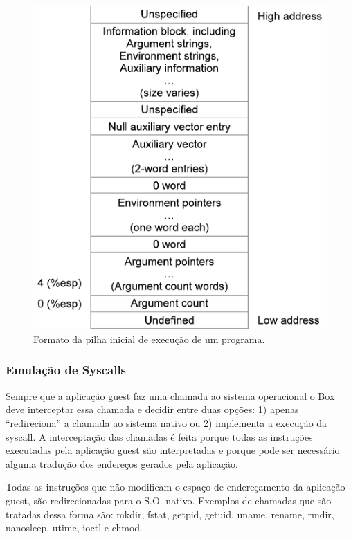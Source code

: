 \documentclass[11pt,twoside]{article}
\begin{document}
\begin{figure}[!h]
  	\begin{center}
    	\includegraphics[scale=0.5]{figures/stack_ini}
	\end{center}
	\caption{Formato da pilha inicial de execução de um programa.}
	\label{fig:stack_ini}
\end{figure}

\subsubsection{Emulação de Syscalls}

Sempre que a aplicação guest faz uma chamada ao sistema operacional o Box deve
interceptar essa chamada e decidir entre duas opções: 1) apenas ``redireciona''
a chamada ao sistema nativo ou 2) implementa a execução da syscall. A
interceptação das chamadas é feita porque todas as instruções executadas pela
aplicação guest são interpretadas e porque pode ser necessário alguma tradução
dos endereços gerados pela aplicação.

Todas as instruções que não modificam o espaço de endereçamento da aplicação
guest, são redirecionadas para o S.O. nativo. Exemplos de chamadas que são
tratadas dessa forma são: mkdir, fstat, getpid, getuid, uname, rename, rmdir,
nanosleep, utime, ioctl e chmod.
\end{document}
